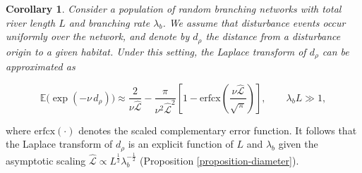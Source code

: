 \documentclass[11pt, class=article, crop=false]{standalone}
\newtheorem{corollary}{Corollary}[subsection]
\theoremstyle{definition}
\begin{document}
\begin{corollary}
\label{collorary-rho}
   Consider a population of random branching networks with total river length $L$ and branching rate $\lambda_b$. 
   We assume that disturbance events occur uniformly over the network, and denote by $d_{\rho}$ the distance from a disturbance origin to a given habitat. 
   Under this setting, the Laplace transform of $d_{\rho}$ can be approximated as

    \begin{equation}
        \mathbb{E}\bigl(\exp({-\nu\,d_{\rho}})\bigr)
        \approx
        \frac{2}{\nu \hat{\mathcal{L}}} 
        - 
        \frac{\pi}{\nu^2 \hat{\mathcal{L}}^2} 
        \left[
           1 
           - 
           \mathrm{erfcx}
           \left(
           \frac{\nu \hat{\mathcal{L}}}{\sqrt{\pi}}
           \right)
        \right],
        \qquad
        \lambda_b L \gg 1,
    \end{equation}
\end{corollary}

where $\mathrm{erfcx}(\cdot)$ denotes the scaled complementary error function.
It follows that the Laplace transform of $d_{\rho}$ is an explicit function of $L$ and $\lambda_b$ given the asymptotic scaling $\hat{\mathcal{L}} \propto L^{\frac{1}{2}} \lambda_b^{-\frac{1}{2}}$ (Proposition \ref{proposition-diameter}).
\end{document}
